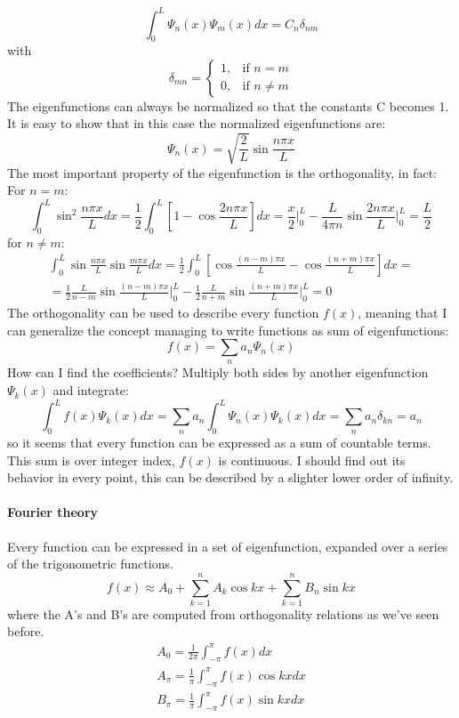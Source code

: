 \begin{equation}
	\int_0^L\Psi_n(x)\Psi_m(x)dx=C_n\delta_{nm}
\end{equation}
with $$\delta_{mn}=\begin{cases}
		1 , & \text{if $n=m$}    \\
		0,  & \text{if $n\ne m$}
	\end{cases}$$
The eigenfunctions can always be normalized so that the constants C becomes 1. It is easy to show that in this case the normalized eigenfunctions are:
\begin{equation}
	\Psi_n(x)=\sqrt{\frac{2}{L}}\sin\frac{n\pi x}{L}
\end{equation}
The most important property of the eigenfunction is the
orthogonality, in fact:
For $n=m$:
$$\int_0^L\sin^2\frac{n\pi x}{L}dx=\frac{1}{2}\int_0^L\left[1-\cos\frac{2n\pi x}{L}\right]dx=\frac{x}{2}\bigg|_0^L-\frac{L}{4\pi n}\sin\frac{2n\pi x}{L}\bigg|_0^L=\frac{L}{2}$$
for $n\ne m$:
\begin{equation*}
	\begin{split}
		\int_0^L\sin\frac{n\pi x}{L}\sin\frac{m\pi x}{L}dx=\frac{1}{2}\int_0^L\left[\cos\frac{(n-m)\pi x}{L}-\cos\frac{(n+m)\pi x}{L}\right]dx= \\
		=\frac{1}{2}\frac{L}{n-m}\sin\frac{(n-m)\pi x}{L}\bigg|_0^L-\frac{1}{2}\frac{L}{n+m}\sin\frac{(n+m)\pi x}{L}\bigg|_0^L=0
	\end{split}
\end{equation*}
The orthogonality can be used to describe every function $f(x)$, meaning that I can generalize the concept managing to write functions as sum of eigenfunctions:
$$f(x)=\displaystyle\sum_na_n\Psi_n(x)$$
How can I find the coefficients? Multiply both sides by another
eigenfunction $\Psi_k(x)$ and integrate:
$$\int_0^Lf(x)\Psi_k(x)dx=\displaystyle\sum_na_n\int_0^L\Psi_n(x)\Psi_k(x)dx=\displaystyle\sum_na_n\delta_{kn}=a_n$$
so it seems that every function can be expressed as a sum of countable terms. This sum is over integer index, $f(x)$ is continuous. I should find out its behavior in every point, this can be described by a slighter lower order of infinity.
\paragraph{Fourier theory} Every function can be expressed in a set of eigenfunction, expanded over a series of the trigonometric functions.
\begin{equation}
	f(x)\approx A_0+\displaystyle\sum_{k=1}^nA_k\cos kx+\sum_{k=1}^nB_n\sin kx
\end{equation}
where the A's and B's are computed from orthogonality relations as we've seen before.
\begin{align*}
	A_0=\frac{1}{2\pi}\int_{-\pi}^{\pi}f(x)dx           \\
	A_{\pi}=\frac{1}{\pi}\int_{-\pi}^{\pi}f(x)\cos kxdx \\
	B_{\pi}=\frac{1}{\pi}\int_{-\pi}^{\pi} f(x)\sin kx dx
\end{align*}

